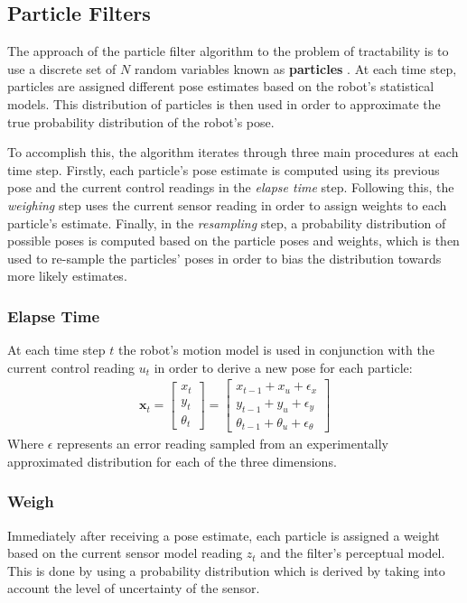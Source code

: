 \documentclass[letterpaper, 12 pt, conference]{ieeeconf}  %
\begin{document}
\subsection{Particle Filters}

The approach of the particle filter algorithm to the problem of tractability is to use a discrete set of $N$ random variables known as \textbf{particles} \cite{thrun2002particle}. At each time step, particles are assigned different pose estimates based on the robot's statistical models. This distribution of particles is then used in order to approximate the true probability distribution of the robot's pose. 
\par
To accomplish this, the algorithm iterates through three main procedures at each time step. Firstly, each particle's pose estimate is computed using its previous pose and the current control readings in the \textit{elapse time} step. Following this, the \textit{weighing} step uses the current sensor reading in order to assign weights to each particle's estimate. Finally, in the \textit{resampling} step, a probability distribution of possible poses is computed based on the particle poses and weights, which is then used to re-sample the particles' poses in order to bias the distribution towards more likely estimates. 

\subsubsection{Elapse Time}
At each time step $t$ the robot's motion model is used in conjunction with the current control reading $u_t$ in order to derive a new pose for each particle:
\begin{align*}
\textbf{x}_t = \begin{bmatrix}
				x_t \\
				y_t \\
				\theta _t
				\end{bmatrix} 
				=
				\begin{bmatrix}
				x_{t-1} + x_u + \epsilon _x\\
				y_{t-1} + y_u + \epsilon _y\\
				\theta _{t-1} + \theta _u + \epsilon _\theta				
				\end{bmatrix}
\end{align*}
Where $\epsilon$ represents an error reading sampled from an experimentally approximated distribution for each of the three dimensions. 
\subsubsection{Weigh}
Immediately after receiving a pose estimate, each particle is assigned a weight based on the current sensor model reading $z_t$ and the filter's perceptual model. This is done by using a probability distribution which is derived by taking into account the level of uncertainty of the sensor. 
\end{document}
